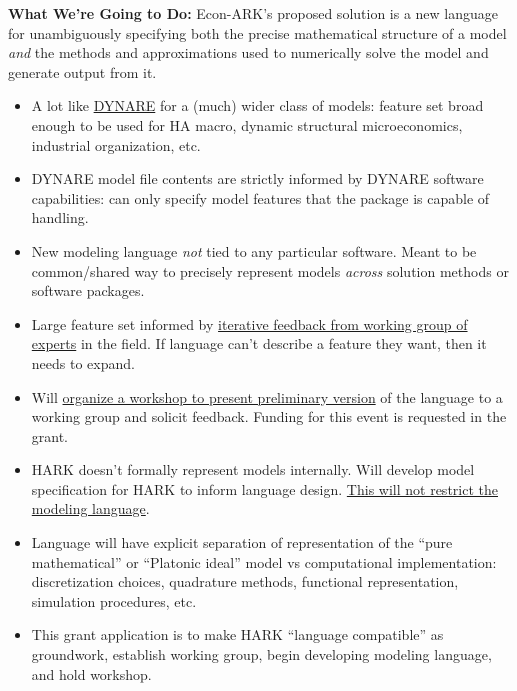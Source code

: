\documentclass[12pt,pdftex,letterpaper]{article}
\begin{document}
\vspace{0.5cm}

\noindent \textbf{What We're Going to Do:} Econ-ARK's proposed solution is a new language for unambiguously specifying both the precise mathematical structure of a model \textit{and} the methods and approximations used to numerically solve the model and generate output from it.

\begin{itemize}
	\item A lot like \href{https://www.dynare.org/}{DYNARE} for a (much) wider class of models: feature set broad enough to be used for HA macro, dynamic structural microeconomics, industrial organization, etc.
	
	\item DYNARE model file contents are strictly informed by DYNARE software capabilities: can only specify model features that the package is capable of handling.
	
	\item New modeling language \textit{not} tied to any particular software. Meant to be common/shared way to precisely represent models \textit{across} solution methods or software packages.
	
	\item Large feature set informed by \underline{iterative feedback from working group of experts} in the field. If language can't describe a feature they want, then it needs to expand.
	
	\item Will \underline{organize a workshop to present preliminary version} of the language to a working group and solicit feedback. Funding for this event is requested in the grant.
	
	\item HARK doesn't formally represent models internally. Will develop model specification for HARK to inform language design. \underline{This will not restrict the modeling language}.
	
	\item Language will have explicit separation of representation of the ``pure mathematical'' or ``Platonic ideal'' model vs computational implementation: discretization choices, quadrature methods, functional representation, simulation procedures, etc.
	
	\item This grant application is to make HARK ``language compatible'' as groundwork, establish working group, begin developing modeling language, and hold workshop.
	

\end{itemize}
\end{document}
